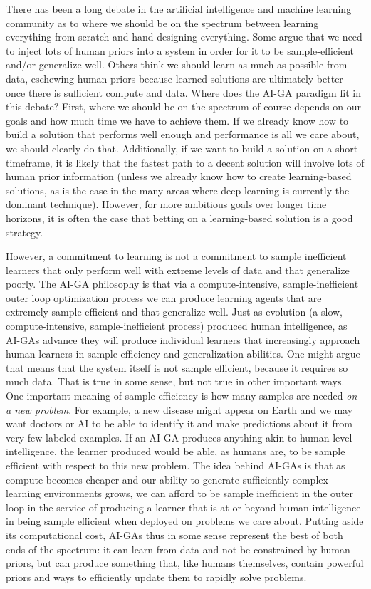 \documentclass{article}
\begin{document}
There has been a long debate in the artificial intelligence and machine learning community as to where we should be on the spectrum between learning everything from scratch and hand-designing everything. Some argue that we need to inject lots of human priors into a system in order for it to be sample-efficient and/or generalize well. Others think we should learn as much as possible from data, eschewing human priors because learned solutions are ultimately better once there is sufficient compute and data. Where does the AI-GA paradigm fit in this debate? First, where we should be on the spectrum of course depends on our goals and how much time we have to achieve them. If we already know how to build a solution that performs well enough and performance is all we care about, we should clearly do that. Additionally, if we want to build a solution on a short timeframe, it is likely that the fastest path to a decent solution will involve lots of human prior information (unless we already know how to create learning-based solutions, as is the case in the many areas where deep learning is currently the dominant technique). However, for more ambitious goals over longer time horizons, it is often the case that betting on a learning-based solution is a good strategy. 

However, a commitment to learning is not a commitment to sample inefficient learners that only perform well with extreme levels of data and that generalize poorly. 
The AI-GA philosophy is that via a compute-intensive, sample-inefficient outer loop optimization process we can produce learning agents that are extremely sample efficient and that generalize well. Just as evolution (a slow, compute-intensive, sample-inefficient process) produced human intelligence, as AI-GAs advance they will produce individual learners that increasingly approach human learners in sample efficiency and generalization abilities. One might argue that means that the system itself is not sample efficient, because it requires so much data. That is true in some sense, but not true in other important ways. One important meaning of sample efficiency is how many samples are needed \emph{on a new problem}. For example, a new disease might appear on Earth and we may want doctors or AI to be able to identify it and make predictions about it from very few labeled examples.  If an AI-GA produces anything akin to human-level intelligence, the learner produced would be able, as humans are, to be sample efficient with respect to this new problem. The idea behind AI-GAs is that as compute becomes cheaper and our ability to generate sufficiently complex learning environments grows, we can afford to be sample inefficient in the outer loop in the service of producing a learner that is at or beyond human intelligence in being sample efficient when deployed on problems we care about. Putting aside its computational cost, AI-GAs thus in some sense represent the best of both ends of the spectrum: it can learn from data and not be constrained by human priors, but can produce something that, like humans themselves, contain powerful priors and ways to efficiently update them to rapidly solve problems. 
\end{document}
